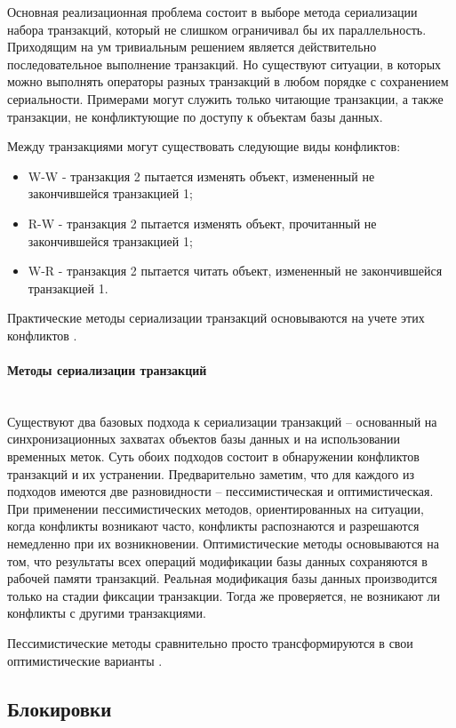 Основная реализационная проблема состоит в выборе метода сериализации набора транзакций, который не слишком ограничивал бы их параллельность. Приходящим на ум тривиальным решением является действительно последовательное выполнение транзакций. Но существуют ситуации, в которых можно выполнять операторы разных транзакций в любом порядке с сохранением сериальности. Примерами могут служить только читающие транзакции, а также транзакции, не конфликтующие по доступу к объектам базы данных.

Между транзакциями могут существовать следующие виды конфликтов:
\begin{itemize}
\item W-W - транзакция 2 пытается изменять объект, измененный не закончившейся транзакцией 1;
\item R-W - транзакция 2 пытается изменять объект, прочитанный не закончившейся транзакцией 1;
\item W-R - транзакция 2 пытается читать объект, измененный не закончившейся транзакцией 1.
\end{itemize}
Практические методы сериализации транзакций основываются на учете этих конфликтов \autocite{Serial}.
\paragraph{Методы сериализации транзакций} ~\\

Существуют два базовых подхода к сериализации транзакций -- основанный на синхронизационных захватах объектов базы данных и на использовании временных меток. Суть обоих подходов состоит в обнаружении конфликтов транзакций и их устранении.
Предварительно заметим, что для каждого из подходов имеются две разновидности -- пессимистическая и оптимистическая. При применении пессимистических методов, ориентированных на ситуации, когда конфликты возникают часто, конфликты распознаются и разрешаются немедленно при их возникновении. Оптимистические методы основываются на том, что результаты всех операций модификации базы данных сохраняются в рабочей памяти транзакций. Реальная модификация базы данных производится только на стадии фиксации транзакции. Тогда же проверяется, не возникают ли конфликты с другими транзакциями.

Пессимистические методы сравнительно просто трансформируются в свои оптимистические варианты \autocite{Serial}.

\subsection{Блокировки} ~\\

